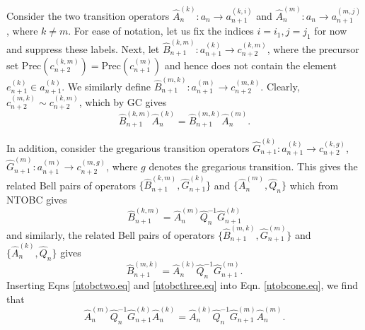 \documentclass[11pt]{article}
\newcommand{\hA}{\hat { A}}
\newcommand{\hG}{\hat G}
\newcommand{\hQ}{\hat Q}
\newcommand{\hB}{\hat B}
\newcommand{\achain}{a}
\newcommand{\pre}{\mathrm{Prec}}
\begin{document}
Consider the two  transition operators  $\hA_n^{(k)}:\achain_n \rightarrow
\achain_{n+1}^{(k,i)}$ and $\hA_n^{(m)}:\achain_n \rightarrow
\achain_{n+1}^{(m,j)}$, where $k \neq m$. For ease of notation, let us fix the indices $i=i_1,
j=j_1$ for now and suppress these labels.  Next, let $\hB_{n+1}^{(k,m)}:
\achain_{n+1}^{(k)} \rightarrow c_{n+2}^{(k,m)}$, where the precursor set 
$\pre(c_{n+2}^{(k,m)})=\pre(c_{n+1}^{(m)})$ and hence does not
contain the element $e_{n+1}^{(k)} \in \achain_{n+1}^{(k)}$. We similarly
define $\hB_{n+1}^{(m,k)}:
\achain_{n+1}^{(m)} \rightarrow c_{n+2}^{(m,k)}$. Clearly,
$c_{n+2}^{(m,k)} \sim c_{n+2}^{(k,m)}$,  which by  GC
gives 
\begin{equation}
\hB_{n+1}^{(k,m)} \hA_{n}^{(k)}=\hB_{n+1}^{(m,k)}
\hA_{n}^{(m)}. \label{ntobcone.eq} 
  \end{equation} 

In addition, consider the gregarious transition operators  $\hG_{n+1}^{(k)}:
\achain_{n+1}^{(k)} \rightarrow c_{n+2}^{(k,g)}$, $\hG_{n+1}^{(m)}:
\achain_{n+1}^{(m)} \rightarrow c_{n+2}^{(m,g)}$, where $g$ denotes the
gregarious transition. This gives the related Bell pairs of
operators $\{\hB_{n+1}^{(k,m)}, \hG_{n+1}^{(k)}\}$ and
$\{\hA_{n}^{(m)}, \hQ_{n}\}$ which from NTOBC gives 
\begin{equation}
\hB_{n+1}^{(k,m)} = \hA_{n}^{(m)} \hQ_{n}^{-1} \hG_{n+1}^{(k)} \label{ntobctwo.eq} 
  \end{equation} 
and similarly, the related Bell pairs of
operators $\{\hB_{n+1}^{(m,k)}, \hG_{n+1}^{(m)}\}$ and
$\{\hA_{n}^{(k)}, \hQ_{n}\}$ gives 
\begin{equation}
\hB_{n+1}^{(m,k)} = \hA_{n}^{(k)}\hQ_{n}^{-1} \hG_{n+1}^{(m)}.  \label{ntobcthree.eq} 
  \end{equation} 
Inserting Eqns \eqref{ntobctwo.eq} and \eqref{ntobcthree.eq} into
Eqn. \eqref{ntobcone.eq}, we find that
\begin{equation}
\hA_{n}^{(m)}  \hQ_{n}^{-1} \hG_{n+1}^{(k)}
 \hA_{n}^{(k)}=\hA_{n}^{(k)} \hQ_{n}^{-1}\hG_{n+1}^{(m)}\hA_{n}^{(m)}
  . \label{ntobcfour.eq} 
\end{equation} 
\end{document}
